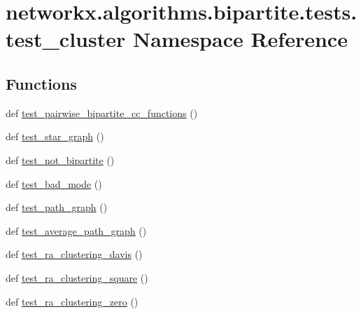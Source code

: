\hypertarget{namespacenetworkx_1_1algorithms_1_1bipartite_1_1tests_1_1test__cluster}{}\section{networkx.\+algorithms.\+bipartite.\+tests.\+test\+\_\+cluster Namespace Reference}
\label{namespacenetworkx_1_1algorithms_1_1bipartite_1_1tests_1_1test__cluster}
\subsection*{Functions}
\begin{DoxyCompactItemize}
\item 
def \hyperlink{namespacenetworkx_1_1algorithms_1_1bipartite_1_1tests_1_1test__cluster_a90cb05d596bb15e5aee90276a20cd78a}{test\+\_\+pairwise\+\_\+bipartite\+\_\+cc\+\_\+functions} ()
\item 
def \hyperlink{namespacenetworkx_1_1algorithms_1_1bipartite_1_1tests_1_1test__cluster_af7f79e59cbd7844858752fb314342f3a}{test\+\_\+star\+\_\+graph} ()
\item 
def \hyperlink{namespacenetworkx_1_1algorithms_1_1bipartite_1_1tests_1_1test__cluster_add91aea649494eed04227e0b8f117711}{test\+\_\+not\+\_\+bipartite} ()
\item 
def \hyperlink{namespacenetworkx_1_1algorithms_1_1bipartite_1_1tests_1_1test__cluster_a922460c5dc4b4caed2be1cbe90a5142d}{test\+\_\+bad\+\_\+mode} ()
\item 
def \hyperlink{namespacenetworkx_1_1algorithms_1_1bipartite_1_1tests_1_1test__cluster_af16bf4d89924925dee952d6ca9e303f0}{test\+\_\+path\+\_\+graph} ()
\item 
def \hyperlink{namespacenetworkx_1_1algorithms_1_1bipartite_1_1tests_1_1test__cluster_a4b329e9e2ac486e303418bf3a571ef81}{test\+\_\+average\+\_\+path\+\_\+graph} ()
\item 
def \hyperlink{namespacenetworkx_1_1algorithms_1_1bipartite_1_1tests_1_1test__cluster_ab4af4fe51c8725cc3a2771885cf82456}{test\+\_\+ra\+\_\+clustering\+\_\+davis} ()
\item 
def \hyperlink{namespacenetworkx_1_1algorithms_1_1bipartite_1_1tests_1_1test__cluster_a0855012f16d235744534201952ec74cb}{test\+\_\+ra\+\_\+clustering\+\_\+square} ()
\item 
def \hyperlink{namespacenetworkx_1_1algorithms_1_1bipartite_1_1tests_1_1test__cluster_a7bf698f90e1587866e37d084879fff88}{test\+\_\+ra\+\_\+clustering\+\_\+zero} ()
\end{DoxyCompactItemize}


